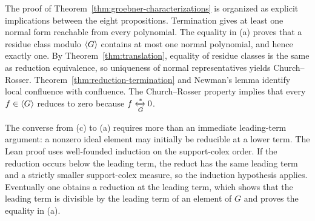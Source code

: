 The proof of Theorem~\ref{thm:groebner-characterizations} is organized as
explicit implications between the eight propositions.  Termination gives at
least one normal form reachable from every polynomial.  The equality in
(a) proves that a residue class modulo $\langle G \rangle$ contains at most one
normal polynomial, and hence exactly one.  By Theorem~\ref{thm:translation},
equality of residue classes is the same as reduction equivalence, so uniqueness
of normal representatives yields Church--Rosser.
Theorem~\ref{thm:reduction-termination} and Newman's lemma identify local
confluence with confluence.  The Church--Rosser property implies that every
$f\in\langle G \rangle$ reduces to zero because $f\xleftrightarrow[G]{*}0$.

The converse from (c) to (a) requires more than an immediate
leading-term argument: a nonzero ideal element may initially be reducible at a
lower term.  The Lean proof uses well-founded induction on the support-colex
order.  If the reduction occurs below the leading term, the reduct has the same
leading term and a strictly smaller support-colex measure, so the induction
hypothesis applies.  Eventually one obtains a reduction at the leading term,
which shows that the leading term is divisible by the leading term of an
element of $G$ and proves the equality in (a).
